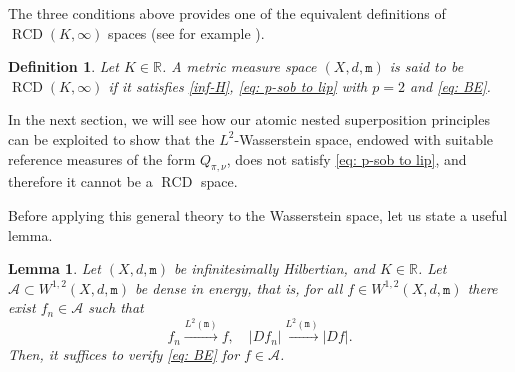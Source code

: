 \documentclass[10pt,leqno]{amsart}
\numberwithin{equation}{section}
\newtheorem{lemma}[teorema]{Lemma}
\newtheorem{df}[teorema]{Definition}
\newcommand{\R}{\mathbb{R}}
\newcommand{\ttm}{\mathtt{m}}
\begin{document}
The three conditions above provides one of the equivalent definitions of $\operatorname{RCD}(K,\infty)$ spaces (see for example \cite{savare2013self, ambrosio2015bakry}).

\begin{df}\label{def: rcd}
    Let $K\in \R$. A metric measure space $(X,d,\ttm)$ is said to be $\operatorname{RCD}(K,\infty)$ if it satisfies \eqref{inf-H}, \eqref{eq: p-sob to lip} with $p=2$ and \eqref{eq: BE}.
\end{df}

In the next section, we will see how our atomic nested superposition principles can be exploited to show that the $L^2$-Wasserstein space, endowed with suitable reference measures of the form $Q_{\pi,\nu}$, does not satisfy \eqref{eq: p-sob to lip}, and therefore it cannot be a $\operatorname{RCD}$ space.

Before applying this general theory to the Wasserstein space, let us state a useful lemma.

\begin{lemma}\label{lemma: BE dense in energy}
    Let $(X,d,\ttm)$ be infinitesimally Hilbertian, and $K\in \R$. Let $\mathcal{A}\subset W^{1,2}(X,d,\ttm)$ be dense in energy, that is, for all $f\in W^{1,2}(X,d,\ttm)$ there exist $f_n \in \mathcal{A}$ such that 
    \begin{equation}\label{eq: dense in energy}
        f_n \overset{L^2(\ttm)}{\longrightarrow} f, \quad |Df_n|  \overset{L^2(\ttm)}{\longrightarrow} |Df|.
    \end{equation}
    Then, it suffices to verify \eqref{eq: BE} for $f\in \mathcal{A}$.
\end{lemma}
\end{document}
